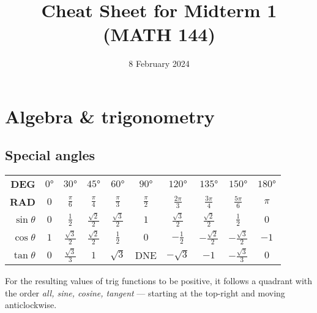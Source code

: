 \documentclass[10pt]{extarticle}
\title{Cheat Sheet for Midterm 1 (MATH 144)}
\date{8 February 2024}
\theoremstyle{definition}
\begin{document}
	\section{Algebra \& trigonometry}
	\subsection*{Special angles}
		\begin{tabular}{r c c c c c c c c c}
			\toprule
			\textbf{DEG} & \(\ang{0}\) & \(\ang{30}\) & \(\ang{45}\) & \(\ang{60}\) & \(\ang{90}\) & \(\ang{120}\) & \(\ang{135}\) & \(\ang{150}\) & \(\ang{180}\) \\
			\textbf{RAD} & \(0\) & \(\frac{\pi}{6}\) & \(\frac{\pi}{4}\) & \(\frac{\pi}{3}\) & \(\frac{\pi}{2}\) & \(\frac{2\pi}{3}\) & \(\frac{3\pi}{4}\) & \(\frac{5\pi}{6}\) & \(\pi\) \\ \midrule
			\(\sin\theta\) & \(0\) & \(\frac{1}{2}\) & \(\frac{\sqrt{2}}{2}\) & \(\frac{\sqrt{3}}{2}\) & \(1\) & \(\frac{\sqrt{3}}{2}\) & \(\frac{\sqrt{2}}{2}\) & \(\frac{1}{2}\) & \(0\) \\
			\(\cos\theta\) & \(1\) & \(\frac{\sqrt{3}}{2}\) & \(\frac{\sqrt{2}}{2}\) & \(\frac{1}{2}\) & \(0\) & \(-\frac{1}{2}\) & \(-\frac{\sqrt{2}}{2}\) & \(-\frac{\sqrt{3}}{2}\) & \(-1\) \\
			\(\tan\theta\) & \(0\) & \(\frac{\sqrt{3}}{3}\) & \(1\) & \(\sqrt{3}\) & DNE & \(-\sqrt{3}\) & \(-1\) & \(-\frac{\sqrt{3}}{3}\) & \(0\) \\
			\bottomrule
		\end{tabular}

		For the resulting values of trig functions to be positive, it follows a quadrant with the order \emph{all, sine, cosine, tangent} —
		starting at the top-right and moving anticlockwise.
\end{document}
